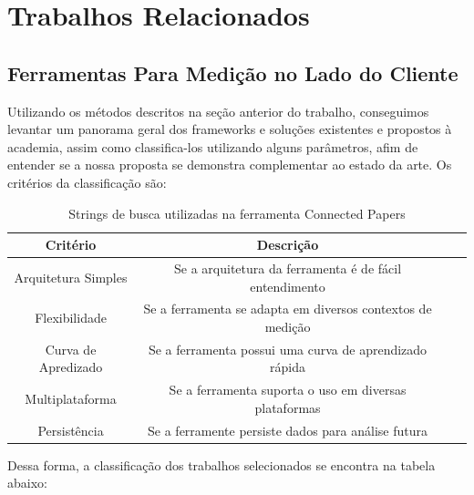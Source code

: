 \documentclass[12pt]{tcc}
\begin{document}
\chapter{Trabalhos Relacionados}
\label{sec:trabalhos_relacionados}
	\label{sec:trab_relacionados}

	\section{Ferramentas Para Medição no Lado do Cliente}
	Utilizando os métodos descritos na seção anterior do trabalho, conseguimos levantar um panorama geral dos frameworks e soluções existentes e propostos à academia, assim como classifica-los utilizando alguns parâmetros, afim de entender se a nossa proposta se demonstra complementar ao estado da arte. 
	Os critérios da classificação são: 


	\begin{table}[!ht]
		\centering
		\caption{Strings de busca utilizadas na ferramenta Connected Papers}
		\begin{tabular}{c c L{1.5cm} R{1.5cm}}
			\toprule
			\textbf{Critério} & \textbf{Descrição}\\
			\midrule
			Arquitetura Simples & Se a arquitetura da ferramenta é de fácil entendimento\\
			Flexibilidade&Se a ferramenta se adapta em diversos contextos de medição\\
			Curva de Apredizado&Se a ferramenta possui uma curva de aprendizado rápida\\
			Multiplataforma&Se a ferramenta suporta o uso em diversas plataformas\\
			Persistência&Se a ferramente persiste dados para análise futura\\
			\bottomrule
		\end{tabular}
		\label{tab:string-busca-connected-papers}
	\end{table}


	\par Dessa forma, a classificação dos trabalhos selecionados se encontra na tabela abaixo:
\end{document}
